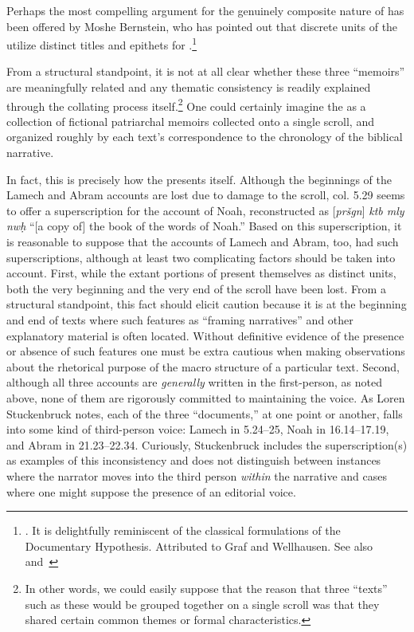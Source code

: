 Perhaps the most compelling argument for the genuinely composite nature of \ga has been offered by Moshe Bernstein, who has pointed out that discrete units of the \ga utilize distinct titles and epithets for \yahweh.\footnote{\cite{bernstein_jbl2009}. It is delightfully reminiscent of the classical formulations of the Documentary Hypothesis. Attributed to Graf and Wellhausen.  See also~\cite{bernstein_as2010} and~\cite{weigold_as2010}}

From a structural standpoint, it is not at all clear whether these three ``memoirs'' are meaningfully related and any thematic consistency is readily explained through the collating process itself.\footnote{In other words, we could easily suppose that the reason that three ``texts'' such as these would be grouped together on a single scroll was that they shared certain common themes or formal characteristics.} One could certainly imagine the \ga as a collection of fictional patriarchal memoirs collected onto a single scroll, and organized roughly by each text's correspondence to the chronology of the biblical narrative. 

In fact, this is precisely how the \ga presents itself. Although the beginnings of the Lamech and Abram accounts are lost due to damage to the scroll, col. 5.29 seems to offer a superscription for the account of Noah, reconstructed as [\emph{pršgn}] \emph{ktb mly nwḥ} ``[a copy of] the book of the words of Noah.'' Based on this superscription, it is reasonable to suppose that the accounts of Lamech and Abram, too, had such superscriptions, although at least two complicating factors should be taken into account. First, while the extant portions of \ga present themselves as distinct units, both the very beginning and the very end of the scroll have been lost. From a structural standpoint, this fact should elicit caution because it is at the beginning and end of texts where such features as ``framing narratives'' and other explanatory material is often located. Without definitive evidence of the presence or absence of such features one must be extra cautious when making observations about the rhetorical purpose of the macro structure of a particular text. Second, although all three accounts are \emph{generally} written in the first-person, as noted above, none of them are rigorously committed to maintaining the voice. As Loren Stuckenbruck notes, each of the three ``documents,'' at one point or another, falls into some kind of third-person voice: Lamech in 5.24--25, Noah in 16.14--17.19, and Abram in 21.23--22.34. Curiously, Stuckenbruck includes the superscription(s) as examples of this inconsistency and does not distinguish between instances where the narrator moves into the third person \emph{within} the narrative and cases where one might suppose the presence of an editorial voice.

